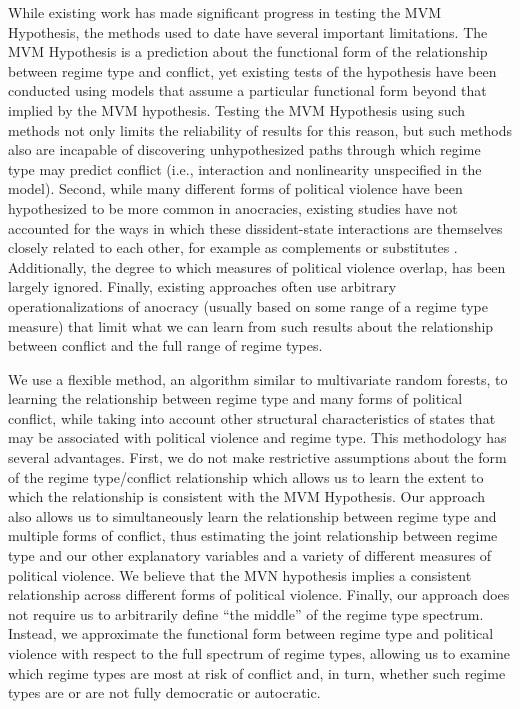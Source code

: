 \documentclass[titlepage, onecolumn,12pt]{article}
\begin{document}
While existing work has made significant progress in testing the MVM Hypothesis, the methods used to date have several important limitations. The MVM Hypothesis is a prediction about the functional form of the relationship between regime type and conflict, yet existing tests of the hypothesis have been conducted using models that assume a particular functional form beyond that implied by the MVM hypothesis. Testing the MVM Hypothesis using such methods not only limits the reliability of results for this reason, but such methods also are incapable of discovering unhypothesized paths through which regime type may predict conflict (i.e., interaction and nonlinearity unspecified in the model). Second, while many different forms of political violence have been hypothesized to be more common in anocracies, existing studies have not accounted for the ways in which these dissident-state interactions are themselves closely related to each other, for example as complements or substitutes \citep{gurr1973civil,tilly1978mobilization,Davenport2012}. Additionally, the degree to which measures of political violence overlap, has been largely ignored. Finally, existing approaches often use arbitrary operationalizations of anocracy (usually based on some range of a regime type measure) that limit what we can learn from such results about the relationship between conflict and the full range of regime types.

We use a flexible method, an algorithm similar to multivariate random forests, to learning the relationship between regime type and many forms of political conflict, while taking into account other structural characteristics of states that may be associated with political violence and regime type. This methodology has several advantages. First, we do not make restrictive assumptions about the form of the regime type/conflict relationship which allows us to learn the extent to which the relationship is consistent with the MVM Hypothesis. Our approach also allows us to simultaneously learn the relationship between regime type and multiple forms of conflict, thus estimating the joint relationship between regime type and our other explanatory variables and a variety of different measures of political violence. We believe that the MVN hypothesis implies a consistent relationship across different forms of political violence. Finally, our approach does not require us to arbitrarily define ``the middle'' of the regime type spectrum. Instead, we approximate the functional form between regime type and political violence with respect to the full spectrum of regime types, allowing us to examine which regime types are most at risk of conflict and, in turn, whether such regime types are or are not fully democratic or autocratic.
\end{document}
